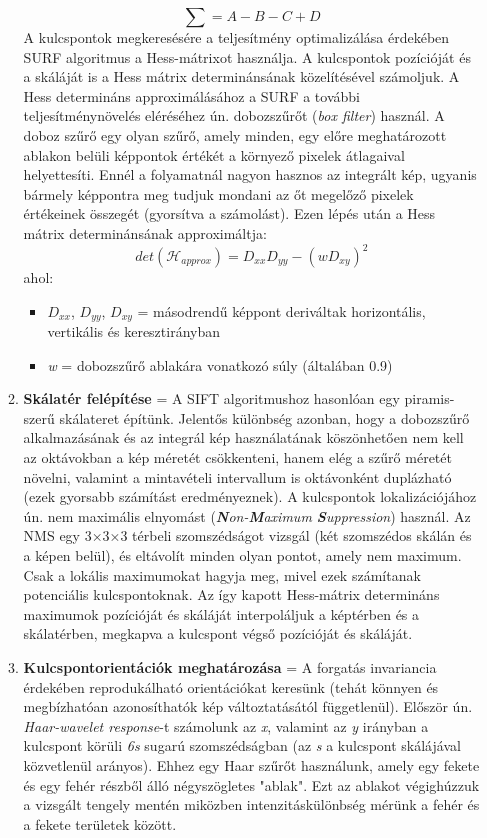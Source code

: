 \documentclass[12pt]{report}
\begin{document}
\begin{enumerate}
\begin{enumerate}
                        \[\sum = A - B - C + D\]
                        A kulcspontok megkeresésére a teljesítmény optimalizálása érdekében SURF algoritmus a Hess-mátrixot használja. A kulcspontok pozícióját és a skáláját is a Hess mátrix determinánsának közelítésével számoljuk. A Hess determináns approximálásához a SURF a további teljesítménynövelés eléréséhez ún. dobozszűrőt (\textit{box filter}) használ. A doboz szűrő egy olyan szűrő, amely minden, egy előre meghatározott ablakon belüli képpontok értékét a környező pixelek átlagaival helyettesíti. Ennél a folyamatnál nagyon hasznos az integrált kép, ugyanis bármely képpontra meg tudjuk mondani az őt megelőző pixelek értékeinek összegét (gyorsítva a számolást). Ezen lépés után a Hess mátrix determinánsának approximáltja:
                        \[det(\mathcal{H}_{approx}) = D_{xx}D_{yy} - (wD_{xy})^2\]
                        ahol:
                        \begin{itemize}
                            \item \textit{$D_{xx}$}, \textit{$D_{yy}$}, \textit{$D_{xy}$} = másodrendű képpont deriváltak horizontális, vertikális és keresztirányban
                            \item \textit{w} = dobozszűrő ablakára vonatkozó súly (általában 0.9)
                        \end{itemize}
                        \item \textbf{Skálatér felépítése} = A SIFT algoritmushoz hasonlóan egy piramis-szerű skálateret építünk. Jelentős különbség azonban, hogy a dobozszűrő alkalmazásának és az integrál kép használatának köszönhetően nem kell az oktávokban a kép méretét csökkenteni, hanem elég a szűrő méretét növelni, valamint a mintavételi intervallum is oktávonként duplázható (ezek gyorsabb számítást eredményeznek). A kulcspontok lokalizációjához ún. nem maximális elnyomást (\textit{\textbf{N}on-\textbf{M}aximum \textbf{S}uppression}) használ. Az NMS egy 3×3×3 térbeli szomszédságot vizsgál (két szomszédos skálán és a képen belül), és eltávolít minden olyan pontot, amely nem maximum. Csak a lokális maximumokat hagyja meg, mivel ezek számítanak potenciális kulcspontoknak. Az így kapott Hess-mátrix determináns maximumok pozícióját és skáláját interpoláljuk a képtérben és a skálatérben, megkapva a kulcspont végső pozícióját és skáláját.
                        \item \textbf{Kulcspontorientációk meghatározása} = A forgatás invariancia érdekében reprodukálható orientációkat keresünk (tehát könnyen és megbízhatóan azonosíthatók kép változtatásától függetlenül). Először ún. \textit{Haar-wavelet response}-t számolunk az \textit{x}, valamint az \textit{y} irányban a kulcspont körüli \textit{6s} sugarú szomszédságban (az \textit{s} a kulcspont skálájával közvetlenül arányos). Ehhez egy Haar szűrőt használunk, amely egy fekete és egy fehér részből álló négyszögletes "ablak". Ezt az ablakot végighúzzuk a vizsgált tengely mentén miközben intenzitáskülönbség mérünk a fehér és a fekete területek között. \\

\end{enumerate}
\end{enumerate}
\end{document}
